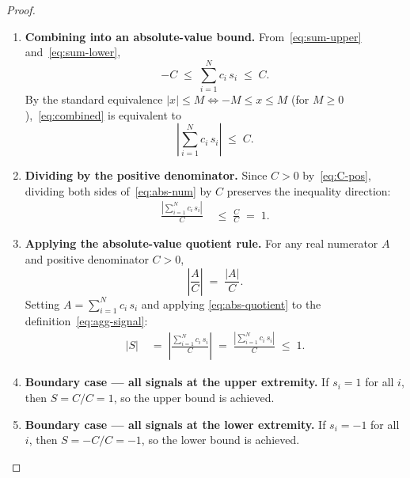 \documentclass[12pt,openany]{book}
\numberwithin{equation}{chapter}
\theoremstyle{plain}
\theoremstyle{definition}
\theoremstyle{remark}
\numberwithin{equation}{chapter}
\theoremstyle{plain}
\begin{document}
\begin{proof}
\begin{enumerate}
  \item \textbf{Combining into an absolute-value bound.}
        From~\eqref{eq:sum-upper} and~\eqref{eq:sum-lower},
        \begin{equation}
          -C \;\leq\; \sum_{i=1}^{N} c_i\,s_i \;\leq\; C.
          \label{eq:combined}
        \end{equation}
        By the standard equivalence $|x| \leq M \Leftrightarrow -M \leq x
        \leq M$ (for $M \geq 0$),~\eqref{eq:combined} is equivalent to
        \begin{equation}
          \left|\sum_{i=1}^{N} c_i\,s_i\right| \;\leq\; C.
          \label{eq:abs-num}
        \end{equation}

  \item \textbf{Dividing by the positive denominator.}
        Since $C > 0$ by~\eqref{eq:C-pos}, dividing both sides
        of~\eqref{eq:abs-num} by $C$ preserves the inequality direction:
        \begin{align}
          \frac{\left|\displaystyle\sum_{i=1}^{N} c_i\,s_i\right|}{C}
            &\;\leq\; \frac{C}{C} \;=\; 1.
          \label{eq:div-C}
        \end{align}

  \item \textbf{Applying the absolute-value quotient rule.}
        For any real numerator $A$ and positive denominator $C > 0$,
        \begin{equation}
          \left|\frac{A}{C}\right| \;=\; \frac{|A|}{C}.
          \label{eq:abs-quotient}
        \end{equation}
        Setting $A = \sum_{i=1}^{N} c_i\,s_i$ and applying
        \eqref{eq:abs-quotient} to the definition~\eqref{eq:agg-signal}:
        \begin{align}
          |S|
            &\;=\; \left|\frac{\displaystyle\sum_{i=1}^{N} c_i\,s_i}{C}
                   \right|
             \;=\; \frac{\left|\displaystyle\sum_{i=1}^{N} c_i\,s_i\right|}
                        {C}
             \;\leq\; 1.
          \label{eq:abs-S}
        \end{align}

  \item \textbf{Boundary case --- all signals at the upper extremity.}
        If $s_i = 1$ for all $i$, then
        $S = C / C = 1$, so the upper bound is achieved.

  \item \textbf{Boundary case --- all signals at the lower extremity.}
        If $s_i = -1$ for all $i$, then
        $S = -C / C = -1$, so the lower bound is achieved.


\end{enumerate}
\end{proof}
\end{document}
